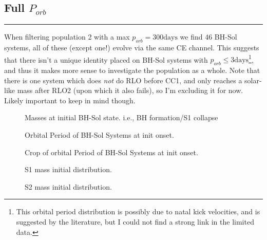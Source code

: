 \documentclass{article}
\theoremstyle{mytheoremstyle}
\theoremstyle{mytheoremstyle}
\theoremstyle{myproblemstyle}
\theoremstyle{myproblemstyle}
\begin{document}
\subsection{Full \(P_{orb}\)}
\hrule
\vspace{.5cm}
When filtering population 2 with a max \(p_{orb} = 300 \text{days}\) we find 46 BH-Sol systems, all of these (except one!) evolve via the same CE channel. This suggests that there isn't a unique identity placed on BH-Sol systems with \(p_{orb} \leq 3 \text{days}\)\footnote{This orbital period distribution is possibly due to natal kick velocities, and is suggested by the literature, but I could not find a strong link in the limited data.}, and thus it makes more sense to investigate the population as a whole. Note that there is one system which does \textit{not} do RLO before CC1, and only reaches a solar-like mass after RLO2 (upon which it also fails), so I'm excluding it for now. Likely important to keep in mind though.


\begin{figure}[H]
    \centering
    \resizebox{0.85\textwidth}{!}{}
    \caption{Masses at initial BH-Sol state. i.e., BH formation/S1 collapse}
\end{figure}


\begin{figure}[H]
    \centering
    \resizebox{0.9\textwidth}{!}{\label{g:OP-BH-Sol}} 
    \caption{Orbital Period of BH-Sol Systems at init onset. }
\end{figure}

\begin{figure}[H]
    \centering
    \resizebox{0.9\textwidth}{!}{\label{g:OP-BH-Sol}} 
    \caption{Crop of orbital Period of BH-Sol Systems at init onset.}
\end{figure}

\begin{figure}[H]
    \centering
    \resizebox{0.9\textwidth}{!}{}
    \caption{S1 mass initial distribution.}
    \label{g:OP-BH-Sol}
\end{figure}

\begin{figure}[H]
    \centering
    \resizebox{0.9\textwidth}{!}{} 
    \caption{S2 mass initial distribution.}
\end{figure}
\end{document}

